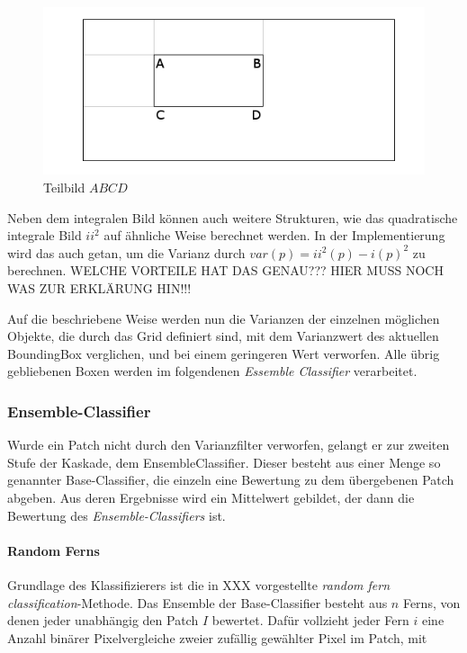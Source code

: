 	\begin{figure}
	\centering{}\includegraphics[scale=0.7]{../pictures/IntegralImage.png}\caption{Teilbild $ABCD$}
	\label{Subwindow}
	\end{figure}

	Neben dem integralen Bild können auch weitere Strukturen, wie das quadratische integrale Bild $ii^{2}$ auf ähnliche Weise berechnet werden. In der Implementierung wird das auch getan, um die Varianz durch $var(p)=ii^{2}(p)-i(p)^{2}$ zu berechnen. WELCHE VORTEILE HAT DAS GENAU??? HIER MUSS NOCH WAS ZUR ERKLÄRUNG HIN!!! 

	Auf die beschriebene Weise werden nun die Varianzen der einzelnen möglichen Objekte, die durch das Grid definiert sind, mit dem Varianzwert des aktuellen BoundingBox verglichen, und bei einem geringeren Wert verworfen. Alle übrig gebliebenen Boxen werden im folgendenen \textit{Essemble Classifier} verarbeitet.

	\subsubsection{Ensemble-Classifier}
	Wurde ein Patch nicht durch den Varianzfilter verworfen, gelangt er zur zweiten Stufe der Kaskade, dem EnsembleClassifier. Dieser besteht aus einer Menge so genannter Base-Classifier, die einzeln eine Bewertung zu dem übergebenen Patch abgeben. Aus deren Ergebnisse wird ein Mittelwert gebildet, der dann die Bewertung des \textit{Ensemble-Classifiers} ist.

	\paragraph{Random Ferns}
	Grundlage des Klassifizierers ist die in XXX vorgestellte \textit{random fern classification}-Methode. Das Ensemble der Base-Classifier besteht aus $n$ Ferns, von denen jeder unabhängig den Patch $I$ bewertet. Dafür vollzieht jeder Fern $i$ eine Anzahl binärer Pixelvergleiche zweier zufällig gewählter Pixel im Patch, mit

